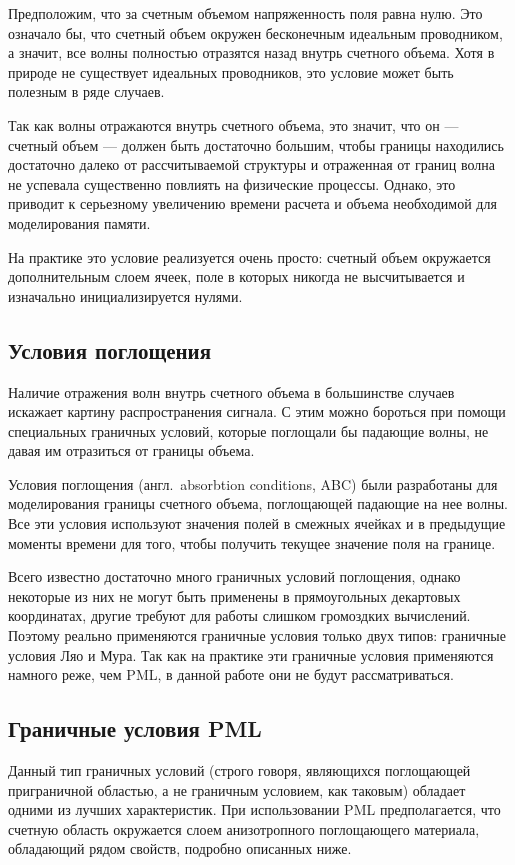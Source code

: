 Предположим, что за счетным объемом напряженность поля равна нулю. Это означало
бы, что счетный объем окружен бесконечным идеальным проводником, а значит, все
волны полностью отразятся назад внутрь счетного объема. Хотя в природе не
существует идеальных проводников, это условие может быть полезным в ряде
случаев.

Так как волны отражаются внутрь счетного объема, это значит, что он --- счетный
объем --- должен быть достаточно большим, чтобы границы находились достаточно
далеко от рассчитываемой структуры и отраженная от границ волна не успевала
существенно повлиять на физические процессы. Однако, это приводит к серьезному
увеличению времени расчета и объема необходимой для моделирования памяти.

На практике это условие реализуется очень просто: счетный объем окружается
дополнительным слоем ячеек, поле в которых никогда не высчитывается и изначально
инициализируется нулями.


\subsection{Условия поглощения}

Наличие отражения волн внутрь счетного объема в большинстве случаев искажает
картину распространения сигнала. С этим можно бороться при помощи специальных
граничных условий, которые поглощали бы падающие волны, не давая им отразиться
от границы объема.

Условия поглощения (англ.~absorbtion conditions, ABC) были разработаны для
моделирования границы счетного объема, поглощающей падающие на нее волны. Все
эти условия используют значения полей в смежных ячейках и в предыдущие моменты
времени для того, чтобы получить текущее значение поля на границе.

Всего известно достаточно много граничных условий поглощения, однако некоторые
из них не могут быть применены в прямоугольных декартовых координатах, другие
требуют для работы слишком громоздких вычислений. Поэтому реально применяются
граничные условия только двух типов: граничные условия Ляо и Мура. Так как на
практике эти граничные условия применяются намного реже, чем PML, в данной
работе они не будут рассматриваться.


\subsection{Граничные условия PML}

Данный тип граничных условий (строго говоря, являющихся поглощающей приграничной
областью, а не граничным условием, как таковым) обладает одними из лучших
характеристик. При использовании PML предполагается, что счетную область
окружается слоем анизотропного поглощающего материала, обладающий рядом свойств,
подробно описанных ниже.

